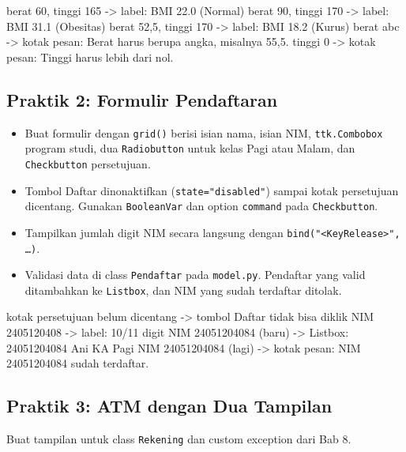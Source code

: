 \begin{keluaran}
berat 60, tinggi 165    -> label: BMI 22.0 (Normal)
berat 90, tinggi 170    -> label: BMI 31.1 (Obesitas)
berat 52,5, tinggi 170  -> label: BMI 18.2 (Kurus)
berat abc               -> kotak pesan: Berat harus berupa angka, misalnya 55,5.
tinggi 0                -> kotak pesan: Tinggi harus lebih dari nol.
\end{keluaran}

\subsection{Praktik 2: Formulir Pendaftaran}

\begin{itemize}
  \item Buat formulir dengan \texttt{grid()} berisi isian nama, isian NIM, \texttt{ttk.Combobox} program studi, dua \texttt{Radiobutton} untuk kelas Pagi atau Malam, dan \texttt{Checkbutton} persetujuan.
  \item Tombol Daftar dinonaktifkan (\texttt{state="disabled"}) sampai kotak persetujuan dicentang. Gunakan \texttt{BooleanVar} dan option \texttt{command} pada \texttt{Checkbutton}.
  \item Tampilkan jumlah digit NIM secara langsung dengan \texttt{bind("<KeyRelease>", \ldots)}.
  \item Validasi data di class \texttt{Pendaftar} pada \texttt{model.py}. Pendaftar yang valid ditambahkan ke \texttt{Listbox}, dan NIM yang sudah terdaftar ditolak.
\end{itemize}

\begin{keluaran}
kotak persetujuan belum dicentang -> tombol Daftar tidak bisa diklik
NIM 2405120408                   -> label: 10/11 digit
NIM 24051204084 (baru)           -> Listbox: 24051204084  Ani  KA  Pagi
NIM 24051204084 (lagi)           -> kotak pesan: NIM 24051204084 sudah terdaftar.
\end{keluaran}

\subsection{Praktik 3: ATM dengan Dua Tampilan}

Buat tampilan untuk class \texttt{Rekening} dan custom exception dari Bab 8.

